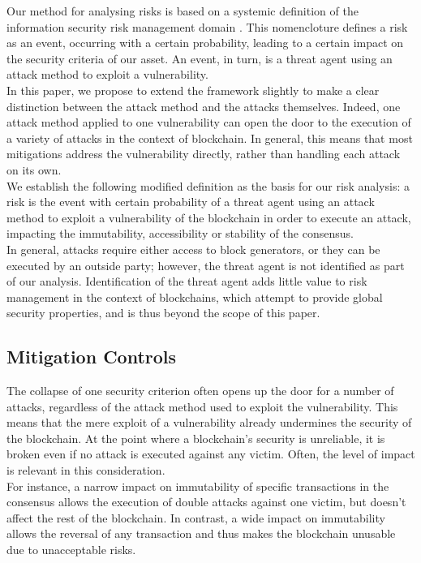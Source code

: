 \documentclass[12pt,a4paper]{article}
\begin{document}
Our method for analysing risks is based on a systemic definition of the information security risk management domain \cite{domain}. This nomencloture defines a risk as an event, occurring with a certain probability, leading to a certain impact on the security criteria of our asset. An event, in turn, is a threat agent using an attack method to exploit a vulnerability.\\

In this paper, we propose to extend the framework slightly to make a clear distinction between the attack method and the attacks themselves. Indeed, one attack method applied to one vulnerability can open the door to the execution of a variety of attacks in the context of blockchain. In general, this means that most mitigations address the vulnerability directly, rather than handling each attack on its own.\\

We establish the following modified definition as the basis for our risk analysis: a risk is the event with certain probability of a threat agent using an attack method to exploit a vulnerability of the \gls{blockchain} in order to execute an attack, impacting the immutability, accessibility or stability of the \gls{consensus}.\\

In general, attacks require either access to block generators, or they can be executed by an outside party; however, the threat agent is not identified as part of our analysis. Identification of the threat agent adds little value to risk management in the context of \glspl{blockchain}, which attempt to provide global security properties, and is thus beyond the scope of this paper.\\

\subsection{Mitigation Controls}

The collapse of one security criterion often opens up the door for a number of attacks, regardless of the attack method used to exploit the vulnerability. This means that the mere exploit of a vulnerability already undermines the security of the \gls{blockchain}. At the point where a \gls{blockchain}'s security is unreliable, it is broken even if no attack is executed against any victim. Often, the level of impact is relevant in this consideration.\\

For instance, a narrow impact on immutability of specific transactions in the \gls{consensus} allows the execution of \gls{double} attacks against one victim, but doesn't affect the rest of the \gls{blockchain}. In contrast, a wide impact on immutability allows the reversal of any transaction and thus makes the \gls{blockchain} unusable due to unacceptable risks.\\
\end{document}
